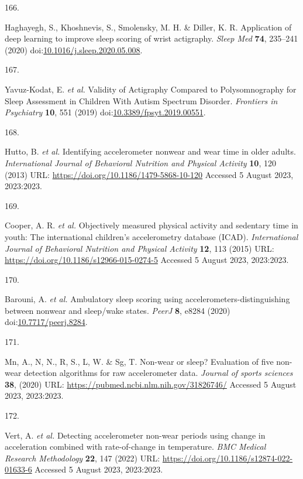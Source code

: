 \documentclass[
  10pt,
]{scrbook}
\newlength{\cslhangindent}
\newlength{\csllabelwidth}
\newlength{\cslentryspacingunit} %
\newenvironment{CSLReferences}[2] %
 {%
  \setlength{\parindent}{0pt}
  \ifodd #1
  \let\oldpar\par
  \def\par{\hangindent=\cslhangindent\oldpar}
  \fi
  \setlength{\parskip}{#2\cslentryspacingunit}
 }%
 {}
\newcommand{\CSLLeftMargin}[1]{\parbox[t]{\csllabelwidth}{#1}}
\newcommand{\CSLRightInline}[1]{\parbox[t]{\linewidth - \csllabelwidth}{#1}\break}
\let\originaltextbf\textbf
\renewcommand{\textbf}[1]{\textcolor{color1}{\originaltextbf{#1}}}
\begin{document}
\begin{CSLReferences}{0}{0}
\leavevmode{}%
\CSLLeftMargin{166. }%
\CSLRightInline{Haghayegh, S., Khoshnevis, S., Smolensky, M. H. \&
Diller, K. R. Application of deep learning to improve sleep scoring of
wrist actigraphy. \emph{Sleep Med} \textbf{74}, 235--241 (2020)
doi:\href{https://doi.org/10.1016/j.sleep.2020.05.008}{10.1016/j.sleep.2020.05.008}.}

\leavevmode{}%
\CSLLeftMargin{167. }%
\CSLRightInline{Yavuz-Kodat, E. \emph{et al.} Validity of Actigraphy
Compared to Polysomnography for Sleep Assessment in Children With Autism
Spectrum Disorder. \emph{Frontiers in Psychiatry} \textbf{10}, 551
(2019)
doi:\href{https://doi.org/10.3389/fpsyt.2019.00551}{10.3389/fpsyt.2019.00551}.}

\leavevmode{}%
\CSLLeftMargin{168. }%
\CSLRightInline{Hutto, B. \emph{et al.} Identifying accelerometer
nonwear and wear time in older adults. \emph{International Journal of
Behavioral Nutrition and Physical Activity} \textbf{10}, 120 (2013) URL:
\url{https://doi.org/10.1186/1479-5868-10-120} Accessed 5 August 2023,
2023:2023.}

\leavevmode{}%
\CSLLeftMargin{169. }%
\CSLRightInline{Cooper, A. R. \emph{et al.} Objectively measured
physical activity and sedentary time in youth: The international
children's accelerometry database ({ICAD}). \emph{International Journal
of Behavioral Nutrition and Physical Activity} \textbf{12}, 113 (2015)
URL: \url{https://doi.org/10.1186/s12966-015-0274-5} Accessed 5 August
2023, 2023:2023.}

\leavevmode{}%
\CSLLeftMargin{170. }%
\CSLRightInline{Barouni, A. \emph{et al.} Ambulatory sleep scoring using
accelerometers-distinguishing between nonwear and sleep/wake states.
\emph{{PeerJ}} \textbf{8}, e8284 (2020)
doi:\href{https://doi.org/10.7717/peerj.8284}{10.7717/peerj.8284}.}

\leavevmode{}%
\CSLLeftMargin{171. }%
\CSLRightInline{Mn, A., N, N., R, S., L, W. \& Sg, T. Non-wear or sleep?
Evaluation of five non-wear detection algorithms for raw accelerometer
data. \emph{Journal of sports sciences} \textbf{38}, (2020) URL:
\url{https://pubmed.ncbi.nlm.nih.gov/31826746/} Accessed 5 August 2023,
2023:2023.}

\leavevmode{}%
\CSLLeftMargin{172. }%
\CSLRightInline{Vert, A. \emph{et al.} Detecting accelerometer non-wear
periods using change in acceleration combined with rate-of-change in
temperature. \emph{{BMC} Medical Research Methodology} \textbf{22}, 147
(2022) URL: \url{https://doi.org/10.1186/s12874-022-01633-6} Accessed 5
August 2023, 2023:2023.}


\end{CSLReferences}
\end{document}
